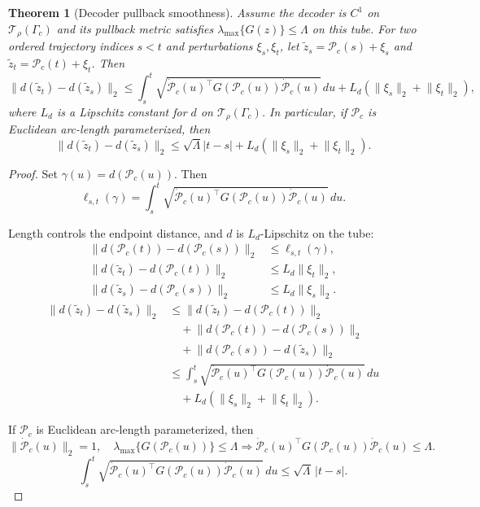 \documentclass{article}
\newtheorem{theorem}{Theorem}
\begin{document}
\begin{theorem}[Decoder pullback smoothness]
	Assume the decoder is $C^1$ on $\mathcal{T}_\rho(\Gamma_c)$ and its pullback metric satisfies $\lambda_{\max}\{G(z)\}\le \Lambda$ on this tube. For two ordered trajectory indices $s<t$ and perturbations $\xi_s,\xi_t$, let $\tilde z_s=\mathcal{P}_c(s)+\xi_s$ and $\tilde z_t=\mathcal{P}_c(t)+\xi_t$. Then
	\[
	\lVert d(\tilde z_t)-d(\tilde z_s)\rVert_2
	\le
	\int_s^t \sqrt{\dot{\mathcal{P}}_c(u)^\top G(\mathcal{P}_c(u))\dot{\mathcal{P}}_c(u)}\,du
	+L_d(\lVert\xi_s\rVert_2+\lVert\xi_t\rVert_2),
	\]
	where $L_d$ is a Lipschitz constant for $d$ on $\mathcal{T}_\rho(\Gamma_c)$. In particular, if $\mathcal{P}_c$ is Euclidean arc-length parameterized, then
	\[
	\lVert d(\tilde z_t)-d(\tilde z_s)\rVert_2
	\le \sqrt{\Lambda}|t-s|+L_d(\lVert\xi_s\rVert_2+\lVert\xi_t\rVert_2).
	\]
\end{theorem}

\begin{proof}
	Set $\gamma(u)=d(\mathcal{P}_c(u))$. Then
	\[
	\ell_{s,t}(\gamma)
	=
	\int_s^t
	\sqrt{\dot{\mathcal{P}}_c(u)^\top G(\mathcal{P}_c(u))\dot{\mathcal{P}}_c(u)}\,du .
	\]

	Length controls the endpoint distance, and $d$ is $L_d$-Lipschitz on the tube:
	\[
	\begin{aligned}
	\lVert d(\mathcal{P}_c(t))-d(\mathcal{P}_c(s))\rVert_2
	&\le \ell_{s,t}(\gamma),\\
	\lVert d(\tilde z_t)-d(\mathcal{P}_c(t))\rVert_2
	&\le L_d\lVert\xi_t\rVert_2,\\
	\lVert d(\tilde z_s)-d(\mathcal{P}_c(s))\rVert_2
	&\le L_d\lVert\xi_s\rVert_2 .
	\end{aligned}
	\]
	\[
	\begin{aligned}
	\lVert d(\tilde z_t)-d(\tilde z_s)\rVert_2
	&\le
	\lVert d(\tilde z_t)-d(\mathcal{P}_c(t))\rVert_2\\
	&\quad+
	\lVert d(\mathcal{P}_c(t))-d(\mathcal{P}_c(s))\rVert_2\\
	&\quad+
	\lVert d(\mathcal{P}_c(s))-d(\tilde z_s)\rVert_2\\
	&\le
	\int_s^t
	\sqrt{\dot{\mathcal{P}}_c(u)^\top G(\mathcal{P}_c(u))\dot{\mathcal{P}}_c(u)}\,du\\
	&\quad+
	L_d(\lVert\xi_s\rVert_2+\lVert\xi_t\rVert_2).
	\end{aligned}
	\]

	If $\mathcal{P}_c$ is Euclidean arc-length parameterized, then
	\[
	\lVert\dot{\mathcal{P}}_c(u)\rVert_2=1,\quad
	\lambda_{\max}\{G(\mathcal{P}_c(u))\}\le\Lambda
	\Longrightarrow
	\dot{\mathcal{P}}_c(u)^\top G(\mathcal{P}_c(u))\dot{\mathcal{P}}_c(u)
	\le\Lambda .
	\]
	\[
	\int_s^t
	\sqrt{\dot{\mathcal{P}}_c(u)^\top G(\mathcal{P}_c(u))\dot{\mathcal{P}}_c(u)}\,du
	\le
	\sqrt{\Lambda}\,|t-s|.
	\]
\end{proof}
\end{document}
